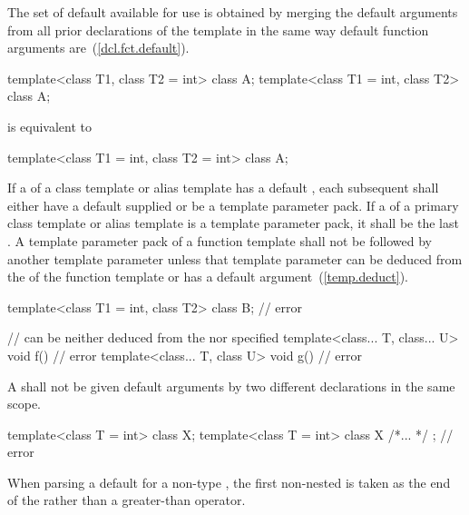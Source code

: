 \pnum
The set of default
available for use is obtained by merging the default arguments
from all prior declarations of the template in the
same way default function arguments are~(\ref{dcl.fct.default}).
\enterexample

\begin{codeblock}
template<class T1, class T2 = int> class A;
template<class T1 = int, class T2> class A;
\end{codeblock}

is equivalent to

\begin{codeblock}
template<class T1 = int, class T2 = int> class A;
\end{codeblock}
\exitexample

\pnum
If a
of a class template or alias template has a default
,
each subsequent
shall either have a default
supplied
or be a template parameter pack. If a 
of a primary class template or alias template is a template parameter pack, it shall be the last
.
A template parameter pack of a function template shall not be followed by
another
template parameter unless that template parameter can be deduced from the
 of the function template or has a
default argument~(\ref{temp.deduct}).
\enterexample

\begin{codeblock}
template<class T1 = int, class T2> class B;   // error

//  can be neither deduced from the  nor specified
template<class... T, class... U> void f() { } // error
template<class... T, class U> void g() { }    // error
\end{codeblock}
\exitexample

\pnum
A
shall
not be given default arguments by two different declarations in the same scope.
\enterexample

\begin{codeblock}
template<class T = int> class X;
template<class T = int> class X { /*... */ }; // error
\end{codeblock}
\exitexample

%
\pnum
When parsing a
default
for a non-type
,
the first non-nested
\tcode{>}
is taken as the end of the
rather than a greater-than operator.
\enterexample

